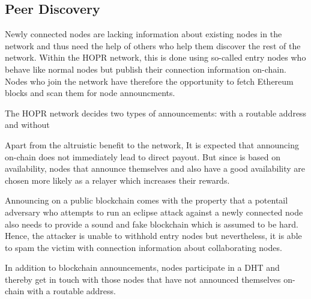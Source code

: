 \subsection{Peer Discovery}

Newly connected nodes are lacking information about existing nodes in the network and thus need the help of others who help them discover the rest of the network. Within the HOPR network, this is done using so-called entry nodes who behave like normal nodes but publish their connection information on-chain. Nodes who join the network have therefore the opportunity to fetch Ethereum blocks and scan them for node announcments.

The HOPR network decides two types of announcements: with a routable address and without

Apart from the altruistic benefit to the network, It is expected that announcing on-chain does not immediately lead to direct payout. But since  is based on availability, nodes that announce themselves and also have a good availability are chosen more likely as a relayer which increases their rewards.

Announcing on a public blockchain comes with the property that a potentail adversary who attempts to run an eclipse attack against a newly connected node also needs to provide a sound and fake blockchain which is assumed to be hard. Hence, the attacker is unable to withhold entry nodes but nevertheless, it is able to spam the victim with connection information about collaborating nodes.

In addition to blockchain announcements, nodes participate in a DHT and thereby get in touch with those nodes that have not announced themselves on-chain with a routable address.